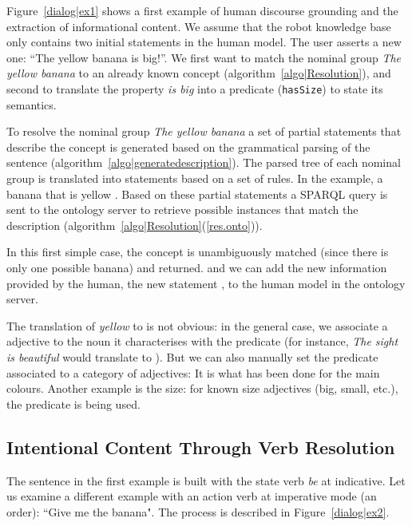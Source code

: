 Figure~\ref{dialog|ex1} shows a first example of human discourse grounding and
the extraction of informational content. We assume that the robot knowledge
base only contains two initial statements in the human model. The user asserts
a new one: ``The yellow banana is big!''.  We first want to match the nominal
group \emph{The yellow banana} to an already known concept
(algorithm~\ref{algo|Resolution}), and second to translate the property
\emph{is big} into a predicate ({\tt hasSize}) to state its semantics.


To resolve the nominal group \emph{The yellow banana} a set of partial
statements that describe the concept is generated based on the grammatical
parsing of the sentence (algorithm~\ref{algo|generatedescription}). The parsed
tree of each nominal group is translated into statements based on a set of
rules.  In the example, a banana  that is yellow
. Based on these partial statements a SPARQL query is
sent to the ontology server to retrieve possible instances that match the
description (algorithm~\ref{algo|Resolution}(\ref{res.onto})).

In this first simple case, the concept  is unambiguously
matched (since there is only one possible banana) and returned. and we can
add the new information provided by the human, \ie the new statement
, to the human model in the ontology server.

The translation of \emph{yellow} to  is not obvious: in
the general case, we associate a adjective to the noun it characterises with
the  predicate (for instance, \emph{The sight is beautiful}
would translate to ). But we can also manually
set the predicate associated to a category of adjectives: It is what has been
done for the main colours. Another example is the size: for known size
adjectives (big, small, etc.), the  predicate is being used.


\subsection{Intentional Content Through Verb Resolution}

The sentence in the first example is built with the state verb \emph{be} at
indicative. Let us examine a different example with an action verb at
imperative mode (an order): ``Give me the banana". The process is described in
Figure~\ref{dialog|ex2}.

